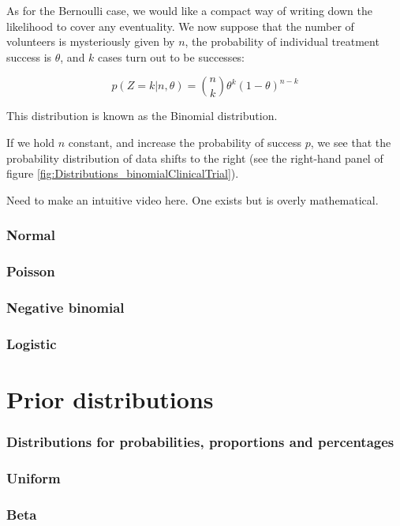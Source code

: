 \documentclass[11pt,fullpage]{book}
\begin{document}
As for the Bernoulli case, we would like a compact way of writing down the likelihood to cover any eventuality. We now suppose that the number of volunteers is mysteriously given by $n$, the probability of individual treatment success is $\theta$, and $k$ cases turn out to be successes:

\begin{equation}\label{eq:Distributions_binomialDef}
p(Z=k|n,\theta) = {n \choose k} \theta^{k} (1-\theta)^{n-k}
\end{equation}

This distribution is known as the Binomial distribution.

If we hold $n$ constant, and increase the probability of success $p$, we see that the probability distribution of data shifts to the right (see the right-hand panel of figure \ref{fig:Distributions_binomialClinicalTrial}).

 Need to make an intuitive video here. One exists but is overly mathematical.

\subsubsection{Normal}
\subsubsection{Poisson}
\subsubsection{Negative binomial}
\subsubsection{Logistic}

\section{Prior distributions}
\subsubsection{Distributions for probabilities, proportions and percentages}
\subsubsection{Uniform}
\subsubsection{Beta}
\end{document}

